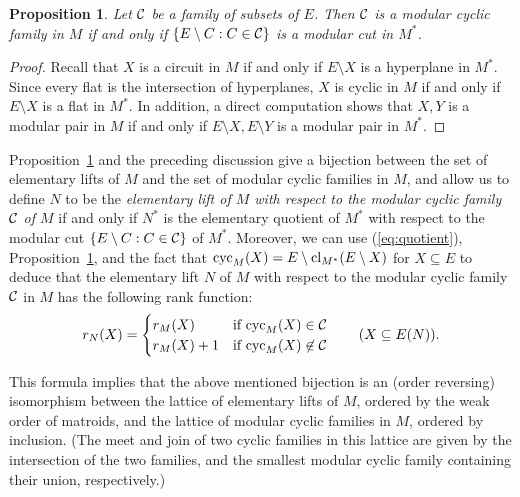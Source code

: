 \documentclass{daj}
\newtheorem{proposition}[thm]{Proposition}\theoremstyle{plain}
\begin{document}
\begin{proposition}\label{prop:modular_cyclic}
Let  ${\cal C}$ be a family of subsets of $E$.
Then ${\cal C}$ is a modular cyclic family in $M$ if and only if
 $\{E\setminus C: C\in {\cal C}\}$ is a modular cut in $M^*$.
\end{proposition}
\begin{proof}
Recall that $X$ is a circuit in $M$ if and only if $E\setminus X$ is a hyperplane in $M^*$.
Since every flat is the intersection of hyperplanes,  $X$ is cyclic in $M$ if and only if $E\setminus X$ is a flat in $M^*$.
In addition, a direct computation shows that  $X, Y$ is a modular pair in $M$ if and only if  $E\setminus X, E\setminus Y$ is a modular pair in $M^*$.
 \end{proof}
 Proposition~\ref{prop:modular_cyclic} and the preceding discussion give  a bijection between   the set of elementary lifts of $M$ and the set of modular cyclic families in $M$, and allow us to define $N$ to be the {\em elementary lift of $M$ with respect to the modular cyclic family $\cal C$ of $M$} if and only if $N^*$ is the {elementary quotient of $M^*$ with respect to the modular cut
 $\{E\setminus C: C\in {\cal C}\}$ of $M^*$.}
 Moreover, we can use (\ref{eq:quotient}), Proposition~\ref{prop:modular_cyclic}, and the fact that ${\rm cyc}_M(X)=E\setminus {\rm cl}_{M^*}(E\setminus X)$ for $X\subseteq E$ to deduce that
 the elementary lift $N$ of $M$ with respect to
the modular cyclic family
 ${\cal C}$ in $M$ has the following rank function:
 \begin{equation}
 \label{eq:lift}
r_N(X)=\begin{cases}
r_M(X) & \mbox{if ${\rm cyc}_M(X)\in {\cal C}$} \\
r_M(X)+1 & \mbox{if ${\rm cyc}_M(X)\not \in {\cal C}$}
\end{cases}
\qquad (X\subseteq E(N)).
\end{equation}

This formula implies that the above mentioned bijection is an (order reversing) isomorphism between the lattice of elementary lifts of $M$, ordered by the weak order of matroids, and the lattice of modular cyclic families in $M$, ordered by inclusion.  (The meet and join of two cyclic families in this lattice are given by  the intersection of the two families, and the smallest modular cyclic family containing their union, respectively.)
\end{document}
